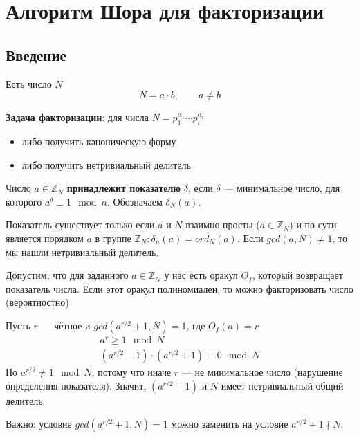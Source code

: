\def\ZN{\mathbb{Z}_{N}}
\newcommand\qubit[1]{\left| #1 \right>}
\chapter{Алгоритм Шора для факторизации}
\section{Введение}

Есть число $N$
\begin{equation*}
  N = a \cdot b,\qquad a \neq b
\end{equation*}

\textbf{Задача факторизации}: для числа
$N = p_{1}^{\alpha_{1}} \cdots p_{t}^{\alpha_{t}}$
\begin{itemize}
  \item либо получить каноническую форму
  \item либо получить нетривиальный делитель
\end{itemize}

Число $a \in \mathbb{Z}_{N}$ \textbf{принадлежит показателю} $\delta$, если
$\delta$ --- минимальное число, для которого
$a^{\delta} \equiv 1 \mod n$.
Обозначаем $\delta_{N}\left( a \right)$.

Показатель существует только если $a$ и $N$ взаимно просты ($a \in \ZN$)
и по сути является порядком $a$ в группе
$\ZN: \delta_{n}\left( a \right) = ord_{N}\left( a \right)$.
Если $gcd\left( a, N \right) \neq 1$, то мы нашли нетривиальный делитель.

Допустим, что для заданного $a \in \ZN$ у нас есть оракул $O_{f}$,
который возвращает показатель числа.
Если этот оракул полиномиален, то можно факторизовать число (вероятностно)

Пусть $r$ --- чётное и $gcd\left( a^{r/2} + 1, N \right) = 1$,
где $O_{f}\left( a \right) = r$
\begin{equation*}
  \begin{split}
    a^{r} \ge 1 \mod N \\
    \left( a^{r/2} - 1 \right) \cdot \left( a^{r/2} + 1 \right) \equiv
      0 \mod N
  \end{split}
\end{equation*}
Но $a^{r/2} \neq 1 \mod N$, потому что иначе $r$ --- не минимальное число
(нарушение определения показателя).
Значит, $\left( a^{r/2} - 1 \right)$ и $N$ имеет нетривиальный общий делитель.

Важно: условие $gcd\left( a^{r/2} + 1, N \right) = 1$ можно заменить на
условие $a^{r/2} + 1 \nmid N$.

